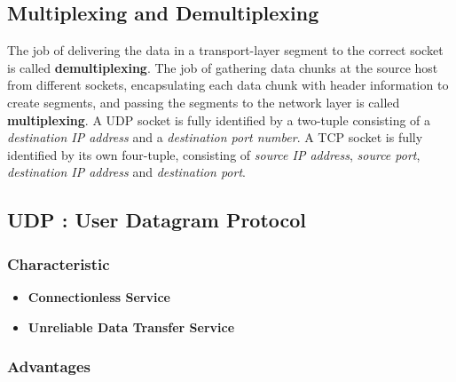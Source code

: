 \documentclass[11pt]{article}
\begin{document}
\subsection{Multiplexing and Demultiplexing}

The job of delivering the data in a transport-layer segment to the correct socket is called \textbf{demultiplexing}. The job of gathering data chunks at the source host from different sockets, encapsulating each data chunk with header information to create segments, and passing the segments to the network layer is called \textbf{multiplexing}. A UDP socket is fully identified by a two-tuple consisting of a \textit{destination IP address} and a \textit{destination port number}. A TCP socket is fully identified by its own four-tuple, consisting of \textit{source IP address}, \textit{source port}, \textit{destination IP address} and \textit{destination port}.


\subsection{UDP : User Datagram Protocol}

\subsubsection{Characteristic}

\begin{itemize}
	\item \textbf{Connectionless Service}
	
	\item \textbf{Unreliable Data Transfer Service}
\end{itemize}

\subsubsection{Advantages}
\end{document}
